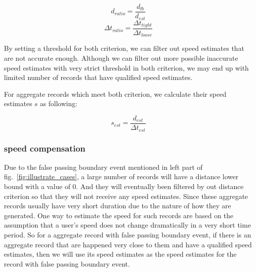 \begin{equation}
  d_{ratio} = \frac{d_{lb}}{d_{est}}
\end{equation}
\begin{equation}
	\Delta t_{ratio} = \frac{\Delta t_{tight}}{\Delta t_{loose}}
\end{equation}

By setting a threshold for both criterion, we can filter out speed estimates that are not accurate enough. Although we can filter out more possible inaccurate speed estimates with very strict threshold in both criterion, we may end up with limited number of records that have qualified speed estimates.

For aggregate records which meet both criterion, we calculate their speed estimates $s$ as following:

\begin{equation}
  s_{est} = \frac{d_{est}}{\Delta t_{est}} 
\end{equation}

\subsubsection{speed compensation}

Due to the false passing boundary event mentioned in left part of fig.~\ref{fig:illustrate_cases}, a large number of records will have a distance lower bound with a value of $0$. And they will eventually been filtered by out distance criterion so that they will not receive any speed estimates. Since these aggregate records usually have very short duration due to the nature of how they are generated. One way to estimate the speed for such records are based on the assumption that a user's speed does not change dramatically in a very short time period. So for a aggregate record with false passing boundary event, if there is an aggregate record that are happened very close to them and have a qualified speed estimates, then we will use its speed estimates as the speed estimates for the record with false passing boundary event.
